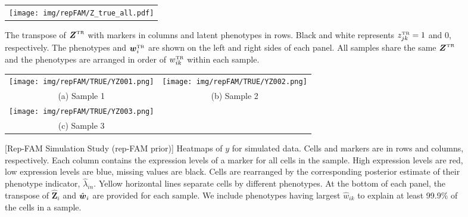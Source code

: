 \documentclass[12pt,]{article}
\def\Z{\bm{Z}}
\newcommand{\true}{{\mbox{\tiny TR}}}
\newcommand{\bZ}{\mbox{\boldmath $Z$}}
\newcommand{\bw}{\mbox{\boldmath $w$}}
\begin{document}
\begin{figure}[t!]
  \begin{center}
\begin{tabular}{c}
\texttt{[image: img/repFAM/Z\_true\_all.pdf]}
  \end{tabular}
 \end{center}
 \vspace{-0.05in}
\caption{The transpose of $\bZ^\true$ with markers in columns and latent
phenotypes in rows. Black and white represents $z^\true_{jk}=1$ and 0,
respectively. The phenotypes and $\bw^\true_i$ are shown on the left and
right sides of each panel.  All samples share the same $\bZ^\true$ and the phenotypes are arranged in order of
$w_{ik}^\true$ within each sample.}
\label{fig:repFAM-sim-Z}
\end{figure}
\begin{figure}[t!]
  \begin{center}
  \begin{tabular}{cc}
  \texttt{[image: img/repFAM/TRUE/YZ001.png]}&
  \texttt{[image: img/repFAM/TRUE/YZ002.png]}\\
  {\small (a) Sample 1} & {\small(b) Sample 2} \\
  \texttt{[image: img/repFAM/TRUE/YZ003.png]}&\\
  {\small (c) Sample 3} & \\
  \end{tabular}
  \end{center}
  \vspace{-0.05in}
  \caption{\small[Rep-FAM Simulation Study (rep-FAM prior)]  Heatmaps of $y$
    for simulated data.  Cells and markers are in rows and columns,
    respectively. Each column contains the expression levels of a marker for
    all cells in the sample.  High expression levels are red, low expression
    levels are blue, missing values are black.  Cells are rearranged by the
    corresponding posterior estimate of their phenotype indicator,
    $\hat{\lambda}_{in}$.  Yellow horizontal lines separate cells by different
    phenotypes.  At the bottom of each panel, the transpose of $\hat{\Z}_i$ and
    $\hat{\bw}_i$ are provided for each sample.  We include phenotypes having
    largest $\hat{w}_{ik}$ to explain at least 99.9\% of the cells in a sample.}
\label{fig:repFAM-TRUE-post-Z}
\end{figure}
\end{document}
